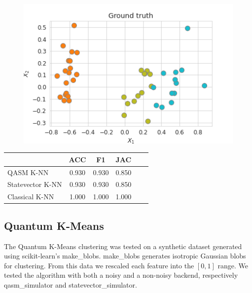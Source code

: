 \documentclass{article}
\begin{document}
\begin{multicols}{2}
\begin{figure}[H]
    \includegraphics[width=\linewidth]{assets/knn/gt.png}
\end{figure}

\begin{center}
\begin{tabular}{lccccl}
\toprule
  & ACC    & F1  & JAC  \\
  \midrule
 QASM K-NN & 0.930 & 0.930 & 0.850    \\
 Statevector K-NN  & 0.930 & 0.930 & 0.850    \\
 Classical K-NN & 1.000 & 1.000 & 1.000   \\
\bottomrule
\end{tabular}
\end{center}


\subsection{Quantum K-Means}
The Quantum K-Means clustering was tested on a synthetic dataset generated using scikit-learn's make\_blobs. make\_blobs generates isotropic Gaussian blobs for clustering. From this data we rescaled each feature into the $[0, 1]$ range. We tested the algorithm with both a noisy and a non-noisy backend, respectively qasm\_simulator and statevector\_simulator.



\end{multicols}
\end{document}
